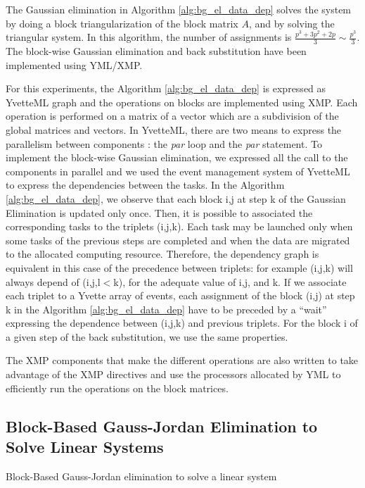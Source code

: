 The Gaussian elimination in Algorithm \ref{alg:bg_el_data_dep} solves the system by doing a block triangularization of the block matrix $A$, and by solving the triangular system.
In this algorithm, the number of assignments is $\frac{p^3+3p^2+2p}{3} \sim \frac{p^3}{3}$.
The block-wise Gaussian elimination and back substitution have been implemented using YML/XMP.

For this experiments, the Algorithm \ref{alg:bg_el_data_dep} is expressed as YvetteML graph and the operations on blocks are implemented using XMP.
Each operation is performed on a matrix of a vector which are a subdivision of the global matrices and vectors.
In YvetteML, there are two means to express the parallelism between components : the \textit{par} loop and the \textit{par} statement.
To implement the block-wise Gaussian elimination, we expressed all the call to the components in parallel and we used the event management system of YvetteML to express the dependencies between the tasks.
In the Algorithm \ref{alg:bg_el_data_dep}, we observe that each block i,j at step k of the Gaussian Elimination is updated only once.
Then, it is possible to associated the corresponding tasks to the triplets (i,j,k).
Each task may be launched only when some tasks of the previous steps are completed and when the data are migrated to the allocated computing resource.
Therefore, the dependency graph is equivalent in this case of the precedence between triplets: for example (i,j,k) will always depend of (i,j,l$<$k), for the adequate value of i,j, and k.
If we associate each triplet to a Yvette array of events, each assignment of the block (i,j) at step k in the Algorithm \ref{alg:bg_el_data_dep} have to be preceded by a “wait” expressing the dependence between (i,j,k) and previous triplets.
For the block i of a given step  of the back substitution, we use the same properties.

The XMP components that make the different operations are also written to take advantage of the XMP directives and use the processors allocated by YML to efficiently run the operations on the block matrices.



\subsection{Block-Based Gauss-Jordan Elimination to Solve Linear Systems}

\begin{algorithm}[h]
	\DontPrintSemicolon
	\caption{Block-Based Gauss-Jordan elimination to solve a linear system \label{alg:bgj_data_dep} }
\end{algorithm}

